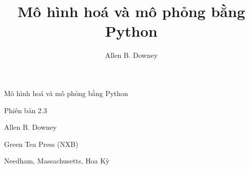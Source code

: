 \documentclass[12pt]{book}
\title{Mô hình hoá và mô phỏng bằng Python}
\author{Allen B. Downey}
\newcommand{\thetitle}{Mô hình hoá và mô phỏng bằng Python}
\newcommand{\theauthors}{Allen B. Downey}
\newcommand{\theversion}{2.3}
\theoremstyle{exercise}
\newcommand\blankpage{%
    \null
    \thispagestyle{empty}%
    \addtocounter{page}{-1}%
    \newpage}
\newif\ifplastex
\begin{document}
\frontmatter

\ifplastex

\maketitle

\else

\begin{latexonly}

%
%
%
%
%
%




\pagebreak
\thispagestyle{empty}

\begin{flushright}
\vspace*{2.0in}

\begin{spacing}{3}
{\huge \thetitle}
\end{spacing}

\vspace{0.25in}

Phiên bản \theversion

\vspace{1in}


{\Large
\theauthors \\
}


\vspace{0.5in}

{\Large Green Tea Press (NXB)}

{\small Needham, Massachusetts, Hoa Kỳ}

\vfill

\end{flushright}




\end{latexonly}
\end{document}
